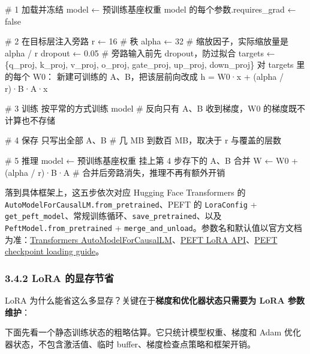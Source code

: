 \documentclass[
  chinese,
]{ctexart}
\newenvironment{Shaded}{\begin{snugshade}}{\end{snugshade}}
\newcommand{\NormalTok}[1]{\textcolor[rgb]{0.00,0.23,0.31}{#1}}
\begin{document}
\begin{Shaded}
\begin{Highlighting}[]
\NormalTok{\# 1 加载并冻结}
\NormalTok{model ← 预训练基座权重}
\NormalTok{model 的每个参数.requires\_grad ← false}

\NormalTok{\# 2 在目标层注入旁路}
\NormalTok{r       ← 16          \# 秩}
\NormalTok{alpha   ← 32          \# 缩放因子，实际缩放量是 alpha / r}
\NormalTok{dropout ← 0.05        \# 旁路输入前先 dropout，防过拟合}
\NormalTok{targets ← \{q\_proj, k\_proj, v\_proj, o\_proj, gate\_proj, up\_proj, down\_proj\}}
\NormalTok{对 targets 里的每个 W0：}
\NormalTok{    新建可训练的 A、B，把该层前向改成 h = W0·x + (alpha / r)·B·A·x}

\NormalTok{\# 3 训练}
\NormalTok{按平常的方式训练 model}
\NormalTok{    \# 反向只有 A、B 收到梯度，W0 的梯度既不计算也不存储}

\NormalTok{\# 4 保存}
\NormalTok{只写出全部 A、B        \# 几 MB 到数百 MB，取决于 r 与覆盖的层数}

\NormalTok{\# 5 推理}
\NormalTok{model ← 预训练基座权重}
\NormalTok{挂上第 4 步存下的 A、B}
\NormalTok{合并 W ← W0 + (alpha / r)·B·A    \# 合并后旁路消失，推理不再有额外开销}
\end{Highlighting}
\end{Shaded}

落到具体框架上，这五步依次对应 Hugging Face Transformers 的
\texttt{AutoModelForCausalLM.from\_pretrained}、PEFT 的
\texttt{LoraConfig} +
\texttt{get\_peft\_model}、常规训练循环、\texttt{save\_pretrained}、以及
\texttt{PeftModel.from\_pretrained} +
\texttt{merge\_and\_unload}。参数名和默认值以官方文档为准：\href{https://huggingface.co/docs/transformers/en/model_doc/auto\#transformers.AutoModelForCausalLM}{Transformers
AutoModelForCausalLM}、\href{https://huggingface.co/docs/peft/en/package_reference/lora}{PEFT
LoRA
API}、\href{https://huggingface.co/docs/peft/en/developer_guides/checkpoint}{PEFT
checkpoint loading guide}。

\subsubsection{3.4.2 LoRA
的显存节省}\label{lora-ux7684ux663eux5b58ux8282ux7701}

LoRA 为什么能省这么多显存？关键在于\textbf{梯度和优化器状态只需要为 LoRA
参数维护}：

下面先看一个静态训练状态的粗略估算。它只统计模型权重、梯度和 Adam
优化器状态，不包含激活值、临时 buffer、梯度检查点策略和框架开销。
\end{document}
